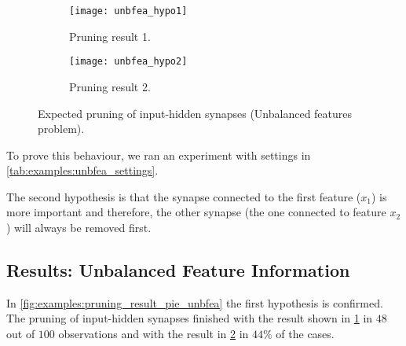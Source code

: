\begin{figure}[H]
\centering
\begin{subfigure}{.4\textwidth}
  \centering
  \texttt{[image: unbfea\_hypo1]}
  \caption{Pruning result 1.}
  \label{fig:examples:unbfea_hypo1}
\end{subfigure}
\begin{subfigure}{.4\textwidth}
  \centering
  \texttt{[image: unbfea\_hypo2]}
  \caption{Pruning result 2.}
  \label{fig:examples:unbfea_hypo2}
\end{subfigure}
\caption{Expected pruning of input-hidden synapses (Unbalanced features problem).}
\label{fig:examples:unbfea_hypos}
\end{figure}

To prove this behaviour, we ran an experiment with settings in \cref{tab:examples:unbfea_settings}.

\begin{table}[H]
\centering
{}
\caption{Experiment settings for dataset with unbalanced feature information.}
\label{tab:examples:unbfea_settings}
\end{table}

The second hypothesis is that the synapse connected to the first feature ($ x_1 $) is more important and therefore, the other synapse (the one connected to feature $ x_2 $) will always be removed first.

\subsection*{Results: Unbalanced Feature Information}
In \cref{fig:examples:pruning_result_pie_unbfea} the first hypothesis is confirmed. The pruning of input-hidden synapses finished with the result shown in \cref{fig:examples:unbfea_hypo1} in $ 48 $ out of $ 100 $ observations and with the result in \cref{fig:examples:unbfea_hypo2} in $ 44\% $ of the cases.

